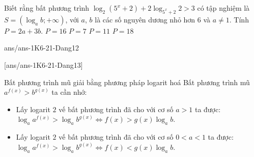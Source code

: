 \begin{ex}%
	Biết rằng bất phương trình $\log_2(5^x+2)+2\log_{5^x+2}2>3$ có tập nghiệm là $S=\left(\log_a b;+\infty\right)$, với $a$, $b$ là các số nguyên dương nhỏ hơn $6$ và $a\ne 1$. Tính $P=2a+3b$.
	\choice
	{\True $P=16$}
	{$P=7$}
	{$P=11$}
	{$P=18$}
\end{ex}

\begin{indapan}{10}
	{ans/ans-1K6-21-Dang12}
\end{indapan}
[ans/ans-1K6-21-Dang13]

\begin{dang}{Bất phương trình mũ giải bằng phương pháp logarit hoá}
	Bất phương trình mũ ${a^{f(x)}}>{b^{g(x)}}$ ta cần nhớ:
	\begin{itemize}
		\item Lấy logarit $2$ vế bất phương trình đã cho với cơ số $a > 1$ ta được: ${{\log }_a}{a^{f(x)}}>{{\log }_a}{b^{g(x)}}\Leftrightarrow f(x)>g(x){{\log }_a}b$.
		\item Lấy logarit $2$ vế bất phương trình đã cho với cơ số $0 < a < 1$ ta được: ${{\log }_a}{a^{f(x)}}>{{\log }_a}{b^{g(x)}}\Leftrightarrow f(x)<g(x){{\log }_a}b$.
	\end{itemize}
\end{dang}
